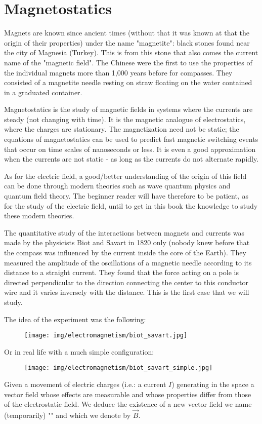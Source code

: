 	\newpage
	\thispagestyle{empty}
	\mbox{}	
	\section{Magnetostatics}
	\lettrine[lines=4]{\color{BrickRed}M}agnets are known since ancient times (without that it was known at that the origin of their properties) under the name "magnetite": black stones found near the city of Magnesia (Turkey). This is from this stone that also comes the current name of the "magnetic field". The Chinese were the first to use the properties of the individual magnets more than 1,000 years before for compasses. They consisted of a magnetite needle resting on straw floating on the water contained in a graduated container.
	
	Magnetostatics is the study of magnetic fields in systems where the currents are steady (not changing with time). It is the magnetic analogue of electrostatics, where the charges are stationary. The magnetization need not be static; the equations of magnetostatics can be used to predict fast magnetic switching events that occur on time scales of nanoseconds or less. It is even a good approximation when the currents are not static - as long as the currents do not alternate rapidly.
	
	As for the electric field, a good/better understanding of the origin of this field can be done through modern theories such as wave quantum physics and quantum field theory. The beginner reader will have therefore to be patient, as for the study of the electric field, until to get in this book the knowledge to study these modern theories.
	
	The quantitative study of the interactions between magnets and currents was made by the physicists Biot and Savart in 1820 only (nobody knew before that the compass was influenced by the current inside the core of the Earth). They measured the amplitude of the oscillations of a magnetic needle according to its distance to a straight current. They found that the force acting on a pole is directed perpendicular to the direction connecting the center to this conductor wire and it varies inversely with the distance. This is the first case that we will study.
	
	The idea of the experiment was the following:
	\begin{figure}[H]
		\centering
		\texttt{[image: img/electromagnetism/biot\_savart.jpg]}
	\end{figure}
	\pagebreak
	Or in real life with a much simple configuration:
	\begin{figure}[H]
		\centering
		\texttt{[image: img/electromagnetism/biot\_savart\_simple.jpg]}
	\end{figure}
	Given a movement of electric charges (i.e.: a current $I$) generating in the space a vector field whose effects are measurable and whose properties differ from those of the electrostatic field. We deduce the existence of a new vector field we name (temporarily) "" and which we denote by $\vec{B}$.
	
